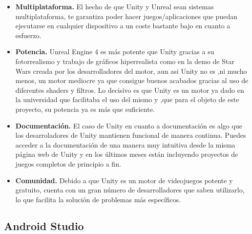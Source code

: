 \begin{itemize}
\item \textbf{Multiplataforma.} El hecho de que Unity y Unreal sean sistemas multiplataforma, te garantiza poder hacer juegos/aplicaciones que puedan ejecutarse en cualquier dispositivo a un coste bastante bajo en cuanto a esfuerzo.

\item  \textbf{Potencia.} Unreal Engine 4 es m\'as potente que Unity gracias a su fotorrealismo y trabajo de gr\'aficos hiperrealista como en la demo de Star Wars creada por los desarrolladores del motor, aun asi Unity no es ,ni mucho menos, un motor mediocre ya que consigue buenos acabados gracias al uso de diferentes shaders y filtros. Lo decisivo es que Unity es un motor ya dado en la universidad que facilitaba el uso del mismo y ,que para el objeto de este proyecto, su potencia ya es m\'as que suficiente.

\item  \textbf{Documentaci\'on.} El caso de Unity en cuanto a documentaci\'on es algo que los desarroladores de Unity mantienen funcional de manera continua. Puedes acceder a la documentaci\'on de una manera muy intuitiva desde la misma p\'agina web de Unity y en los \'ultimos meses est\'an incluyendo proyectos de juegos completos de principio a fin.

\item  \textbf{Comunidad.} Debido a que Unity es un motor de videojuegos potente y gratuito, cuenta con un gran n\'umero de desarrolladores que saben utilizarlo, lo que facilita la soluci\'on de problemas m\'as espec\'ificos.
\end{itemize}


\subsection{Android Studio}
\label{cap2:subsec:androidstudio}

